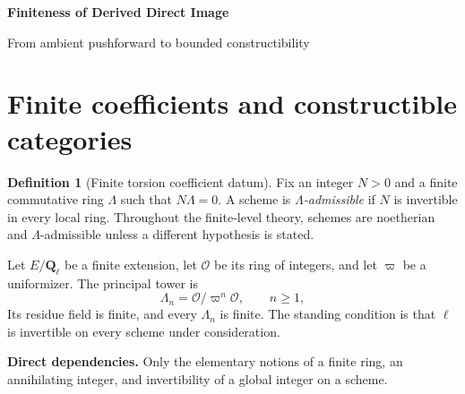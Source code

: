 \documentclass[10pt]{article}
\theoremstyle{definition}
\newtheorem{definition}[theorem]{Definition}
\newcommand{\deps}[1]{\par\smallskip\noindent\textbf{Direct dependencies.} #1}
\begin{document}
\begin{center}
{\large\bfseries Finiteness of Derived Direct Image\par}
\medskip
{\normalsize From ambient pushforward to bounded constructibility\par}
\end{center}

\begin{abstract}
For finite torsion coefficients, ordinary direct image is first derived on
the ambient sheaf category by $K$-injective replacement.  Exceptional direct
image is first constructed on $D^+$ from compactifications and is independent
of every compactification choice.  Finite morphisms, curve finiteness,
affine-space reduction, noetherian devissage, and finite Cech assembly then
give bounded constructible and finite-Tor outputs.  Coefficient change and
etale--pro-etale comparison preserve these outputs.  All derived categories
are ordinary Verdier-localized triangulated categories.
\end{abstract}

\tableofcontents

\section{Finite coefficients and constructible categories}

\begin{definition}[Finite torsion coefficient datum]
Fix an integer $N>0$ and a finite commutative ring $\Lambda$ such that
$N\Lambda=0$.  A scheme is \emph{$\Lambda$-admissible} if $N$ is invertible
in every local ring.  Throughout the finite-level theory, schemes are
noetherian and $\Lambda$-admissible unless a different hypothesis is stated.

Let $E/\mathbf Q_\ell$ be a finite extension, let $\mathcal O$ be its ring
of integers, and let $\varpi$ be a uniformizer.  The principal tower is
\[
 \Lambda_n=\mathcal O/\varpi^n\mathcal O,\qquad n\geq1,
\]
Its residue field is finite, and every $\Lambda_n$ is finite.  The standing
condition is that $\ell$ is invertible on every scheme under consideration.
\deps{Only the elementary notions of a finite ring, an annihilating integer,
and invertibility of a global integer on a scheme.}
\end{definition}
\end{document}
